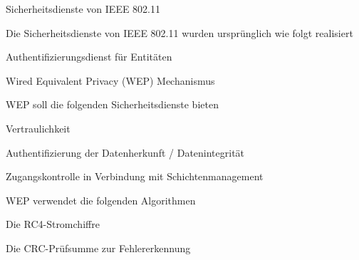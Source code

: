 \documentclass[a4paper]{article}
\begin{document}
\begin{multicols}{3}
      Sicherheitsdienste von IEEE 802.11
      \begin{itemize*}
            \item Die Sicherheitsdienste von IEEE 802.11 wurden ursprünglich wie folgt realisiert
            \begin{itemize*}
                  \item Authentifizierungsdienst für Entitäten
                  \item Wired Equivalent Privacy (WEP) Mechanismus
            \end{itemize*}
            \item WEP soll die folgenden Sicherheitsdienste bieten
            \begin{itemize*}
                  \item Vertraulichkeit
                  \item Authentifizierung der Datenherkunft / Datenintegrität
                  \item Zugangskontrolle in Verbindung mit Schichtenmanagement
            \end{itemize*}
            \item WEP verwendet die folgenden Algorithmen
            \begin{itemize*}
                  \item Die RC4-Stromchiffre
                  \item Die CRC-Prüfsumme zur Fehlererkennung
            \end{itemize*}
      \end{itemize*}


\end{multicols}
\end{document}
